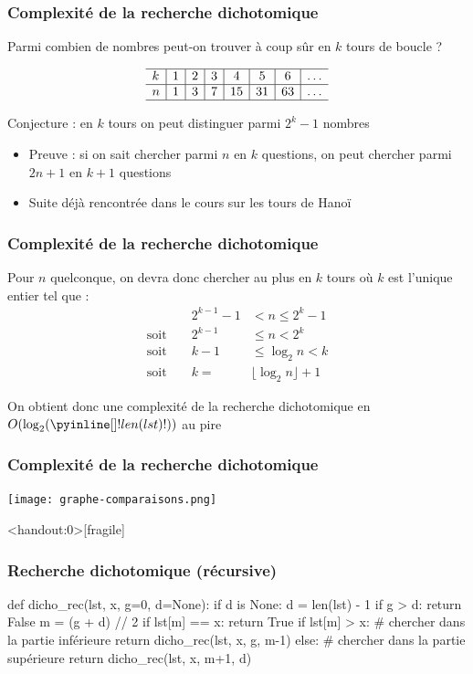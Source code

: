 \documentclass[12pt]{linfo-beamer}
\begin{document}
\begin{frame}
  \frametitle{Complexité de la recherche dichotomique}

  Parmi combien de nombres peut-on trouver à coup sûr en $k$ tours de boucle ?

  \[
    \begin{array}[c]{l|c|c|c|c|c|c|c}
      \hline
      k & 1 & 2 & 3 & 4 & 5 & 6 & \ldots \\\hline
      n & 1 & 3 & 7 & 15 & 31 & 63 & \ldots\\
      \hline
    \end{array}
  \]


  Conjecture : en $k$ tours on peut distinguer parmi $2^k - 1$ nombres
  \begin{itemize}
  \item Preuve : si on sait chercher parmi $n$ en $k$ questions, on
    peut chercher parmi $2n + 1$ en $k+1$ questions
  \item Suite déjà rencontrée dans le cours sur les tours de Hanoï
  \end{itemize}
\end{frame}


\begin{frame}
  \frametitle{Complexité de la recherche dichotomique}


  Pour $n$ quelconque, on devra donc chercher au plus en $k$ tours où $k$ est
  l'unique entier tel que :
  \begin{align*}
     & & 2^{k-1} - 1 & < n \leq 2^k - 1 \\
    \text{soit } & & 2^{k-1} & \leq n < 2^k \\
    \text{soit } & & k-1 & \leq \log_2 n < k \\
    \text{soit } & & k = & \lfloor \log_2 n \rfloor + 1
  \end{align*}


  On obtient donc une complexité de la recherche dichotomique en
  $O(\log_2(\code{len(lst)}))$ au pire
\end{frame}


\begin{frame}
  \frametitle{Complexité de la recherche dichotomique}


  \texttt{[image: graphe-comparaisons.png]}
\end{frame}



\begin{frame}<handout:0>[fragile]
\frametitle{Recherche dichotomique (récursive)}

\small
\begin{pyframe}{}
def dicho_rec(lst, x, g=0, d=None):
    if d is None:
        d = len(lst) - 1
    if g > d:
        return False
    m = (g + d) // 2
    if lst[m] == x:
        return True
    if lst[m] > x:
        # chercher dans la partie inférieure
        return dicho_rec(lst, x, g, m-1)
    else:
        # chercher dans la partie supérieure
        return dicho_rec(lst, x, m+1, d)
\end{pyframe}
\end{frame}
\end{document}
